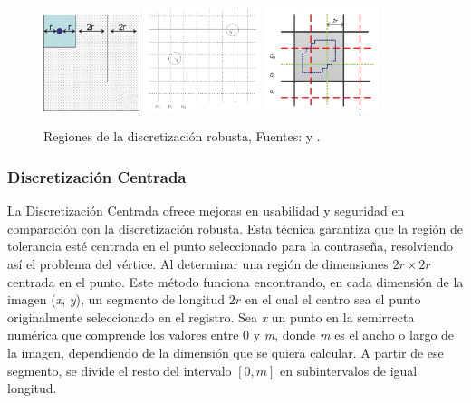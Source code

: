 		\begin{figure}[H]
			\centering
			\includegraphics[width=0.25\textwidth]{image4.jpg}
			\includegraphics[width=0.3\textwidth]{image2.png}
			\includegraphics[width=0.3\textwidth]{image3.png}
			\caption{Regiones de la discretizaci\'on robusta, Fuentes: \cite{zhu2013security} y \cite{chiasson2008centered}.}
		\end{figure}
	
\subsubsection{Discretización Centrada}
	
La Discretización Centrada \cite{chiasson2008centered} ofrece mejoras en usabilidad y seguridad en comparación con la discretización robusta. Esta técnica garantiza que la región de tolerancia esté centrada en el punto seleccionado para la contraseña, resolviendo así el problema del vértice. Al determinar una región de dimensiones \(2r \times 2r\) centrada en el punto. Este método funciona encontrando, en cada dimensión de la imagen (\textit{x}, \textit{y}), un segmento de longitud \(2r\) en el cual el centro sea el punto originalmente seleccionado en el registro. Sea \textit{x} un punto en la semirrecta numérica que comprende los valores entre 0 y \textit{m}, donde \textit{m} es el ancho o largo de la imagen, dependiendo de la dimensión que se quiera calcular. A partir de ese segmento, se divide el resto del intervalo $[0, m]$ en subintervalos de igual longitud.

